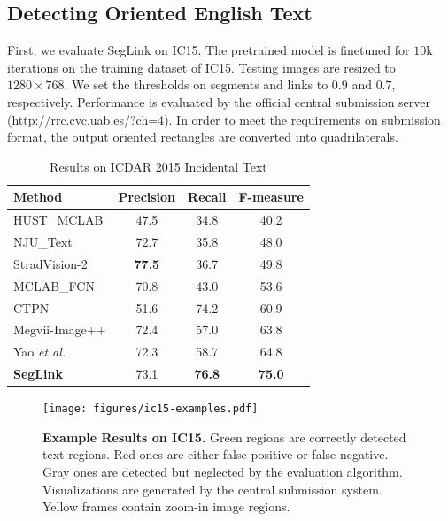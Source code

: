 \documentclass[10pt,twocolumn,letterpaper]{article}
\begin{document}
\subsection{Detecting Oriented English Text}
First, we evaluate SegLink on IC15.
The pretrained model is finetuned for $10$k iterations on the training dataset of IC15.
Testing images are resized to $1280 \times 768$.
We set the thresholds on segments and links to $0.9$ and $0.7$, respectively.
Performance is evaluated by the official central submission server (\url{http://rrc.cvc.uab.es/?ch=4}).
In order to meet the requirements on submission format, the output oriented rectangles are converted into quadrilaterals.

\begin{table} %
  \caption{Results on ICDAR 2015 Incidental Text}
  \vspace{0.5em}
  \centering
  \small
  \label{tbl:ic15-results}
    \begin{tabular}{|l|c|c|c|}
    \hline
    \textbf{Method} & \textbf{Precision} & \textbf{Recall} & \textbf{F-measure}\tabularnewline
    \hline
    \hline
    HUST\_MCLAB & 47.5 & 34.8 & 40.2\tabularnewline
    \hline
    NJU\_Text & 72.7 & 35.8 & 48.0\tabularnewline
    \hline
    StradVision-2 & \textbf{77.5} & 36.7 & 49.8\tabularnewline
    \hline
    MCLAB\_FCN~\cite{cvpr/ZhangZSYLB16} & 70.8 & 43.0 & 53.6\tabularnewline
    \hline
    CTPN~\cite{eccv/TianHHH016} & 51.6 & 74.2 & 60.9\tabularnewline
    \hline
    Megvii-Image++ & 72.4 & 57.0 & 63.8\tabularnewline
    \hline
    Yao \emph{et al.}~\cite{corr/YaoBSZZC16} & 72.3 & 58.7 & 64.8\tabularnewline
    \hline
    \textbf{SegLink} & 73.1 & \textbf{76.8} & \textbf{75.0}\tabularnewline
    \hline
    \end{tabular}
\end{table}

\begin{figure}[t]
  \centering
  \texttt{[image: figures/ic15-examples.pdf]}
  \caption{\textbf{Example Results on IC15.} Green regions are correctly detected text regions. Red ones are either false positive or false negative. Gray ones are detected but neglected by the evaluation algorithm. Visualizations are generated by the central submission system. Yellow frames contain zoom-in image regions. }
  \label{fig:ic15-examples}
\end{figure}
\end{document}
